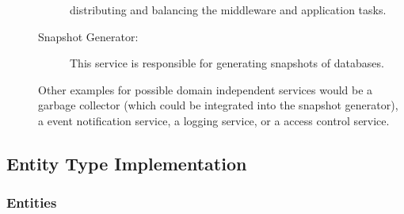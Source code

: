 \documentclass[a4paper, 10pt]{book}
\begin{document}
\begin{description}
\begin{description}
                                distributing and balancing the middleware and application tasks.
                            \item[Snapshot Generator:] This service is responsible for
                                generating snapshots of databases.
                        \end{description}
                        Other examples for possible domain independent services would be a
                        garbage collector (which could be integrated into the snapshot
                        generator), a event notification service, a logging service, or a
                        access control service. 
                \end{description}

                \subsection{Entity Type Implementation}


                \subsubsection{Entities}
                \label{sec:entities}
\end{document}
